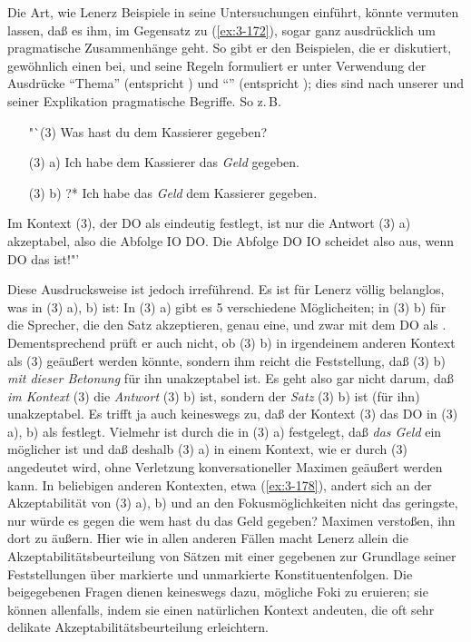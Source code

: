 \documentclass[output=paper]{langsci/langscibook}
\begin{document}
Die Art, wie Lenerz Beispiele in seine Untersuchungen einführt, könnte
vermuten lassen, daß es ihm, im Gegensatz zu (\ref{ex:3-172}), sogar ganz
ausdrücklich um pragmatische Zusammenhänge geht. So gibt er den
Beispielen, die er diskutiert, gewöhnlich einen 
bei, und seine Regeln formuliert er unter Verwendung der Ausdrücke
"`Thema"' (entspricht ) und "`"' (entspricht );
dies sind nach unserer und seiner \citep[11ff]{Lenerz77} Explikation pragmatische
Begriffe. So z.\,B.
\begin{exe}
\settowidth{}
\ex\label{ex:3-177}
\begin{enumerate}
		\setlength{\itemindent}{2em}
	\item["`(3)\hphantom{(a)}]Was hast du dem Kassierer gegeben?
		\item[\hphantom{"`}(3) a)] Ich habe dem Kassierer das \textit{Geld} gegeben.
	\item[\hphantom{"`}(3) b)]?* Ich habe das \textit{Geld} dem Kassierer gegeben.
\end{enumerate}
Im Kontext (3), der DO als  eindeutig festlegt, ist nur die Antwort (3) a) akzeptabel, also die Abfolge IO DO. Die Abfolge DO IO scheidet also aus, wenn DO das  ist!"' \citep[43]{Lenerz77}
\end{exe}
Diese Ausdrucksweise ist jedoch irreführend. Es ist für Lenerz völlig
belanglos, was in (3) a), b)  ist: In (3) a) gibt es 5
verschiedene Möglicheiten; in (3) b) für die Sprecher, die den Satz
akzeptieren, genau eine, und zwar mit dem DO als
. Dementsprechend prüft er auch nicht, ob (3) b) in irgendeinem
anderen Kontext als (3) geäußert werden könnte, sondern ihm reicht die
Feststellung, daß (3) b) \textit{mit dieser Betonung} für ihn
unakzeptabel ist. Es geht also gar nicht darum, daß \textit{im
  Kontext} (3) die \textit{Antwort} (3) b)  ist, sondern
der \emph{Satz} (3) b) ist (für ihn) unakzeptabel. Es trifft ja auch
keineswegs zu, daß der Kontext (3) das DO in (3) a), b) als 
festlegt. Vielmehr ist durch die  in (3) a) festgelegt, daß
\textit{das Geld} ein möglicher  ist und daß deshalb (3) a) in einem
Kontext, wie er durch (3) angedeutet wird, ohne Verletzung
konversationeller Maximen geäußert werden kann. In beliebigen anderen
Kontexten, etwa (\ref{ex:3-178}), andert sich an der Akzeptabilität von (3) a),
b) und an den Fokusmöglichkeiten nicht das geringste, nur würde es
gegen die
\ea
\label{ex:3-178}
wem hast du das Geld gegeben?
\z
Maximen verstoßen, ihn dort zu äußern. Hier wie in allen anderen
Fällen macht Lenerz allein die Akzeptabilitätsbeurteilung von Sätzen
mit einer gegebenen  zur Grundlage seiner Feststellungen über
markierte und unmarkierte Konstituentenfolgen. Die beigegebenen Fragen
dienen keineswegs dazu, mögliche Foki zu eruieren; sie können
allenfalls, indem sie einen natürlichen Kontext andeuten, die oft sehr
delikate Akzeptabilitätsbeurteilung erleichtern.
\end{document}
